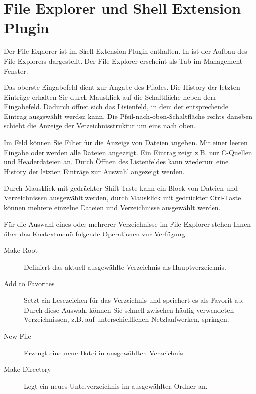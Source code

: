 \section{File Explorer und Shell Extension Plugin}\label{sec:file_explorer}

Der File Explorer  ist im Shell Extension Plugin enthalten. In  ist der Aufbau des File Explorers dargestellt. Der File Explorer erscheint als Tab  im Management Fenster.

Das oberste Eingabefeld dient zur Angabe des Pfades. Die History der letzten Einträge erhalten Sie durch Mausklick auf die Schaltfläche neben dem Eingabefeld. Dadurch öffnet sich das Listenfeld, in dem der entsprechende Eintrag ausgewählt werden kann. Die Pfeil-nach-oben-Schaltfläche rechts daneben schiebt die Anzeige der Verzeichnisstruktur um eins nach oben.

Im Feld  können Sie Filter für die Anzeige von Dateien angeben. Mit einer leeren Eingabe oder \codeline{*} werden alle Dateien angezeigt. Ein Eintrag  zeigt z.B. nur C-Quellen und Headerdateien an. Durch Öffnen des Listenfeldes kann wiederum eine History der letzten Einträge zur Auswahl angezeigt werden.


Durch Mausklick mit gedrückter Shift-Taste kann ein Block von Dateien und Verzeichnissen ausgewählt werden, durch Mausklick mit gedrückter Ctrl-Taste können mehrere einzelne Dateien und Verzeichnisse ausgewählt werden.

Für die Auswahl eines oder mehrerer Verzeichnisse im File Explorer stehen Ihnen über das Kontextmenü folgende Operationen zur Verfügung:

\begin{description}
\item[Make Root] Definiert das aktuell ausgewählte Verzeichnis als Hauptverzeichnis.
\item[Add to Favorites] Setzt ein Lesezeichen für das Verzeichnis und speichert es als Favorit ab. Durch diese Auswahl können Sie schnell zwischen häufig verwendeten Verzeichnissen, z.B. auf unterschiedlichen Netzlaufwerken, springen.
\item[New File] Erzeugt eine neue Datei in ausgewählten Verzeichnis.
\item[Make Directory] Legt ein neues Unterverzeichnis im ausgewählten Ordner an.
\end{description}


